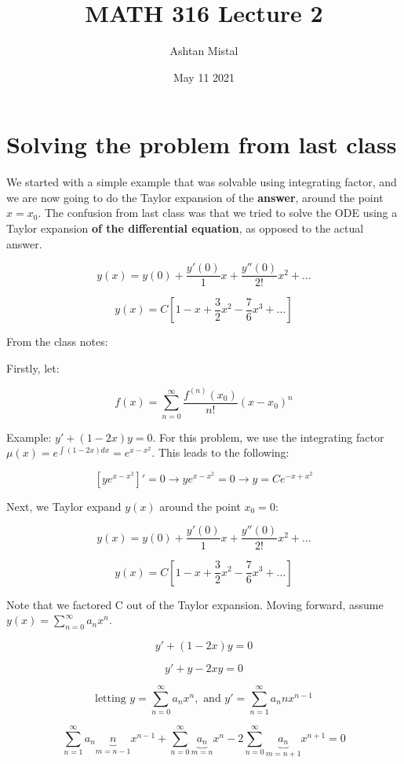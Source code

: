 \documentclass{article}
\title{MATH 316 Lecture 2}
\author{Ashtan Mistal}
\date{May 11 2021}
\begin{document}
\ifstandalone
\maketitle
\fi

\graphicspath{{./Lecture02/}}

\section{Solving the problem from last class}

We started with a simple example that was solvable using integrating factor, and we are now going to do the Taylor expansion of the \textbf{answer}, around the point $x = x_0$. The confusion from last class was that we tried to solve the ODE using a Taylor expansion \textbf{of the differential equation}, as opposed to the actual answer. 

$$y(x) = y(0) + \frac{y'(0)}{1} x + \frac{y''(0)}{2!} x^2 + ...$$

$$y(x) = C \left[1 - x + \frac{3}{2} x^2 - \frac{7}{6} x^3 + ... \right]$$

From the class notes:


Firstly, let:

$$f(x) = \sum_{n = 0}^\infty \frac{f^{(n)} (x_0)}{n!} (x - x_0)^n$$

Example: $y' + (1-2x) y = 0$. For this problem, we use the integrating factor $\mu(x) = e^{\int (1-2x) dx} = e^{x - x^2}$. This leads to the following:

$$\left[ y e^{x - x^2} \right]' = 0 \to y e^{x - x^2} = 0 \to y = C e^{-x + x^2}$$

Next, we Taylor expand $y(x)$ around the point $x_0 = 0$:

$$y(x) = y(0) + \frac{y'(0)}{1} x + \frac{y''(0)}{2!} x^2 + ...$$

$$y(x) = C \left[ 1-x+\frac{3}{2} x^2 - \frac{7}{6} x^3 + ... \right]$$


Note that we factored C out of the Taylor expansion. Moving forward, assume $y(x) = \sum_{n = 0}^{\infty} a_n x^n$. 

$$y' + (1 - 2x) y = 0$$

$$y' + y - 2xy = 0$$

$$\text{letting } y = \sum_{n = 0}^{\infty} a_n x^n, \text{ and } y' = \sum_{n = 1}^{\infty} a_n n x^{n-1}$$

$$\sum_{n = 1}^{\infty} a_n \underbrace{n}_{m = n-1} x^{n-1} + \sum_{n = 0}^{\infty} \underbrace{a_n}_{m = n} x^n - 2 \sum_{n = 0}^{\infty} \underbrace{a_n}_{m = n+1} x^{n+1} = 0$$
\end{document}
